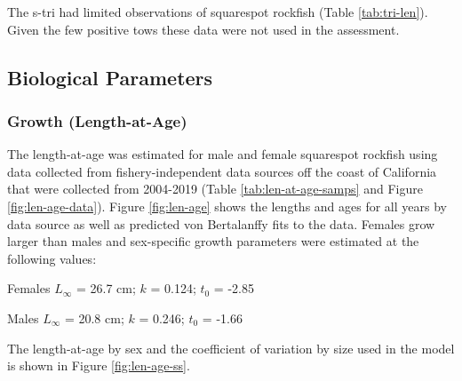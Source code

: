 \documentclass[11pt,
  english,
  a4paper,
]{article}
\begin{document}
The \Gls{s-tri} had limited observations of squarespot rockfish (Table \ref{tab:tri-len}). Given the few positive tows these data were not used in the assessment.

\leavevmode\tagmcend\tagstructend\par


\hypertarget{biological-parameters}{%
\subsection{Biological Parameters}\label{biological-parameters}}

\leavevmode\tagmcend\tagstructend


\hypertarget{growth-length-at-age}{%
\subsubsection{Growth (Length-at-Age)}\label{growth-length-at-age}}

\leavevmode\tagmcend\tagstructend


The length-at-age was estimated for male and female squarespot rockfish using data collected from fishery-independent data sources off the coast of California that were collected from 2004-2019 (Table \ref{tab:len-at-age-samps} and Figure \ref{fig:len-age-data}). Figure \ref{fig:len-age} shows the lengths and ages for all years by data source as well as predicted von Bertalanffy fits to the data. Females grow larger than males and sex-specific growth parameters were estimated at the following values:

\leavevmode\tagmcend\tagstructend\par

\begin{centering}

Females $L_{\infty}$ = 26.7 cm; $k$ = 0.124; $t_0$ = -2.85

Males $L_{\infty}$ = 20.8 cm; $k$ = 0.246; $t_0$ = -1.66

\end{centering}

\vspace{0.5cm}


The length-at-age by sex and the coefficient of variation by size used in the model is shown in Figure \ref{fig:len-age-ss}.
\end{document}
